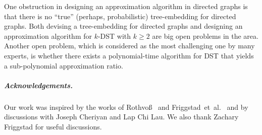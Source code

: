 \documentclass[11pt]{article}
\theoremstyle{definition}
\theoremstyle{remark}
\begin{document}
One obstruction in designing an approximation algorithm in directed
graphs is that there is no ``true'' (perhaps, probabilistic) tree-embedding for
directed graphs.
Both devising a tree-embedding for directed graphs and designing an
approximation algorithm for $k$-DST with $k \geq 2$ are big open
problems in the area.
Another open problem, which is considered as the most challenging one
by many experts, is whether there exists a polynomial-time algorithm
for DST that yields a sub-polynomial approximation ratio.

\subparagraph*{Acknowledgements.}
Our work was inspired by the works of 
Rothvo{\ss}~\cite{Rothvoss11} and 
Friggstad~et~al.~\cite{FriggstadKKLST14}
and by discussions with Joseph Cheriyan and Lap Chi Lau.
We also thank Zachary Friggstad for useful discussions.



\end{document}
